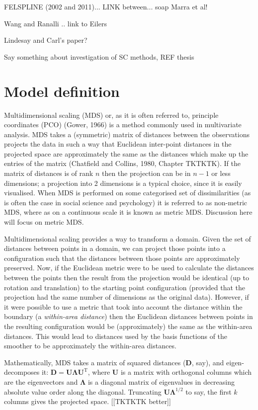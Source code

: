 \documentclass[useAMS,referee]{biom}
\begin{document}
FELSPLINE (2002 and 2011)... LINK between... soap Marra et al!

Wang and Ranalli .. link to Eilers

Lindesay and Carl's paper?


Say something about investigation of SC methods, REF thesis

\section{Model definition}
\label{proposed-model}

Multidimensional scaling (MDS) or, as it is often referred to, principle coordinates (PCO) (Gower, 1966) is a method commonly used in multivariate analysis. MDS takes a (symmetric) matrix of distances between the observations projects the data in such a way that Euclidean inter-point distances in the projected space are approximately the same as the distances which make up the entries of the matrix (Chatfield and Collins, 1980, Chapter TKTKTK). If the matrix of distances is of rank $n$ then the projection can be in $n-1$ or less dimensions; a projection into 2 dimensions is a typical choice, since it is easily visualised. When MDS is performed on some categorised set of dissimilarities (as is often the case in social science and psychology) it is referred to as non-metric MDS, where as on a continuous scale it is known as metric MDS. Discussion here will focus on metric MDS.

Multidimensional scaling provides a way to transform a domain. Given the set of distances between points in a domain, we can project those points into a configuration such that the distances between those points are approximately preserved. Now, if the Euclidean metric were to be used to calculate the distances between the points then the result from the projection would be identical (up to rotation and translation) to the starting point configuration (provided that the projection had the same number of dimensions as the original data). However, if it were possible to use a metric that took into account the distance within the boundary (a \textit{within-area distance}) then the Euclidean distances between points in the resulting configuration would be (approximately) the same as the within-area distances. This would lead to distances used by the basis functions of the smoother to be approximately the within-area distances.

Mathematically, MDS takes a matrix of squared distances ($\mathbf{D}$, say), and eigen-decomposes it: $\mathbf{D}=\mathbf{U}\mathbf{\Lambda}\mathbf{U}^\text{T}$, where $\mathbf{U}$ is a matrix with orthogonal columns which are the eigenvectors and $\mathbf{\Lambda}$ is  a diagonal matrix of eigenvalues in decreasing absolute value order along the diagonal. Truncating $\mathbf{U}\mathbf{\Lambda}^{1/2}$ to say, the first $k$ columns gives the projected space. [[TKTKTK better]]
\end{document}

